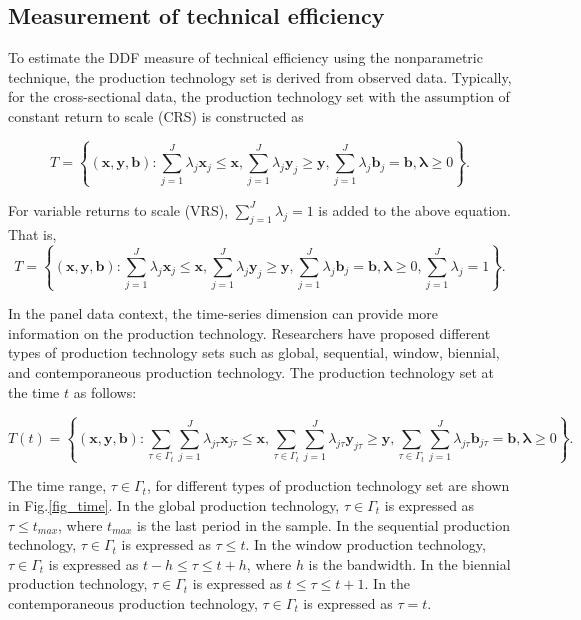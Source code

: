 \subsection{Measurement of technical efficiency}
To estimate the DDF measure of technical efficiency using the nonparametric technique, the production technology set is derived from observed data. Typically, for the cross-sectional data, the production technology set with the assumption of constant return to scale (CRS) is constructed as

\begin{equation}\label{eq_tech_dea}
    T = \left\{ {({\pmb{x}},{\pmb{y}},{\pmb{b}}):\sum\limits_{j = 1}^J {{\lambda _j}{{\pmb{x}}_j} \le {\pmb{x}},\sum\limits_{j = 1}^J {{\lambda _j}{{\pmb{y}}_j} \ge {\pmb{y}},} \sum\limits_{j = 1}^J {{\lambda _j}{{\pmb{b}}_j} = {\pmb{b}},} }  {\pmb{\lambda }} \ge 0} \right\}.
\end{equation}

For variable returns to scale (VRS), $\sum_{j=1}^{J} \lambda_j =1$ is added to the above equation. That is,
\begin{equation}\label{eq_tech_dea_v}
    T = \left\{ {({\pmb{x}},{\pmb{y}},{\pmb{b}}):\sum\limits_{j = 1}^J {{\lambda _j}{{\pmb{x}}_j} \le {\pmb{x}},\sum\limits_{j = 1}^J {{\lambda _j}{{\pmb{y}}_j} \ge {\pmb{y}},} \sum\limits_{j = 1}^J {{\lambda _j}{{\pmb{b}}_j} = {\pmb{b}},} }  {\pmb{\lambda }} \ge 0}, \sum\limits_{j = 1}^J {{\lambda _j} = 1} \right\}.
\end{equation}

In the panel data context, the time-series dimension can provide more information on the production technology. Researchers have proposed different types of production technology sets such as global, sequential, window, biennial, and contemporaneous production technology. The production technology set at the time $t$ as follows:

\begin{equation}\label{eq_tech_dea_panel}
	T(t) = \left\{ {({\pmb{x}},{\pmb{y}},{\pmb{b}}):\sum\limits_{\tau \in \Gamma_t }\sum\limits_{j = 1}^J {{\lambda _{j\tau}}{{\pmb{x}}_{j\tau}} \le {\pmb{x}},\sum\limits_{\tau \in \Gamma_t }\sum\limits_{j = 1}^J {{\lambda _{j\tau}}{{\pmb{y}}_{j\tau}} \ge {\pmb{y}},} \sum\limits_{\tau \in \Gamma_t }\sum\limits_{j = 1}^J {{\lambda _{j\tau}}{{\pmb{b}}_{j\tau}} = {\pmb{b}},} } {\pmb{\lambda }} \ge 0} \right\}.
\end{equation}


The time range, $\tau \in \Gamma_t$, for different types of production technology set are shown in Fig.\ref{fig_time}. In the global production technology, $\tau \in \Gamma_t$ is expressed as $\tau \leq t_{max}$, where $t_{max}$ is the last period in the sample. In the sequential production technology, $\tau \in \Gamma_t$ is expressed as $\tau \leq t$. In the window production technology, $\tau \in \Gamma_t$ is expressed as $t - h \leq \tau \leq t + h $, where $h$ is the bandwidth.  In the biennial production technology, $\tau \in \Gamma_t$ is expressed as $t \leq \tau \leq t + 1 $. In the contemporaneous production technology, $\tau \in \Gamma_t$ is expressed as $\tau=t$. 

